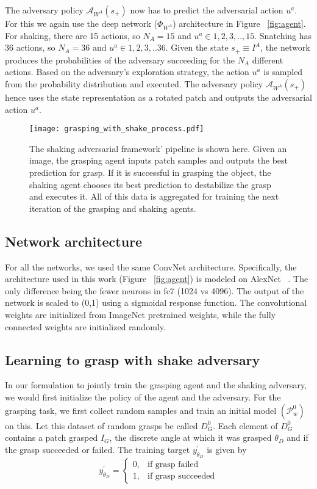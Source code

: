 \documentclass[letterpaper, 10 pt, conference]{ieeeconf}  %
\begin{document}
 The adversary policy $\mathcal{A}_{W^A}(s_+)$ now has to predict the adversarial action $u^a$. For this we again use the deep network ($\Phi_{W^A}$) architecture in Figure ~\ref{fig:agent}. For shaking, there are 15 actions, so $N_A=15$ and $u^a \in {1,2,3,..,15}$. Snatching has 36 actions, so $N_A=36$ and $u^a \in {1,2,3,..36}$. Given the state $s_+\equiv I^A$, the network produces the probabilities of the adversary succeeding for the $N_A$ different actions. Based on the adversary's exploration strategy, the action $u^a$ is sampled from the probability distribution and executed. The adversary policy $\mathcal{A}_{W^A}(s_+)$ hence uses the state representation as a rotated patch and outputs the adversarial action $u^a$. 

\begin{figure*}[t!]
\begin{center}
\texttt{[image: grasping\_with\_shake\_process.pdf]}
\end{center}
\caption{The shaking adversarial framework' pipeline is shown here. Given an image, the grasping agent inputs patch samples and outputs the best prediction for grasp. If it is successful in grasping the object, the shaking agent chooses its best prediction to destabilize the grasp and executes it. All of this data is aggregated for training the next iteration of the grasping and shaking agents.}
\label{fig:grasp_with_shake}
\end{figure*}\subsection{Network architecture} For all the networks, we used the same ConvNet architecture. Specifically, the architecture used in this work (Figure ~\ref{fig:agent}) is modeled on AlexNet ~\cite{krizhevsky2012imagenet}. The only difference being the fewer neurons in fc7 (1024 vs 4096). The output of the network is scaled to (0,1) using a sigmoidal response function. The convolutional weights are initialized from ImageNet pretrained weights, while the fully connected weights are initialized randomly.

\subsection{Learning to grasp with shake adversary}
In our formulation to jointly train the grasping agent and the shaking adversary, we would first initialize the policy of the agent and the adversary. For the grasping task, we
first collect random samples \cite{pinto2016supersizing} and train an initial model $(\mathcal{P}^{0}_w )$ on this. Let this dataset of random grasps be called $D^{0}_G$. Each element of $D^{0}_G$ contains
a patch grasped $I_G$, the discrete angle at which it was grasped $\theta_D$ and if the grasp succeeded or failed. The training target $y^{\prime}_{\theta_D}$ is given by
\begin{equation}
    y^{\prime}_{\theta_D}= 
\begin{cases}
    0,& \text{if grasp failed}\\
    1,& \text{if grasp succeeded}
\end{cases}
\end{equation}
\end{document}
